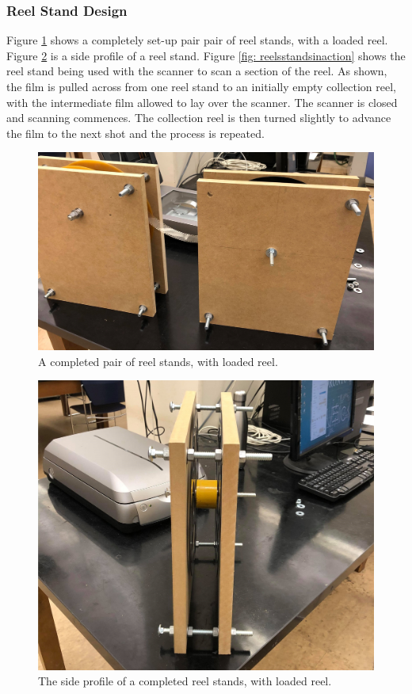 \documentclass[12pt]{article} %
\begin{document}
\subsubsection{Reel Stand Design}
Figure \ref{fig: full setup} shows a completely set-up pair pair of reel stands, with a loaded reel. Figure \ref{fig: side profile} is a side profile of a reel stand. Figure \ref{fig: reelsstandsinaction} shows the reel stand being used with the scanner to scan a section of the reel. As shown, the film is pulled across from one reel stand to an initially empty collection reel, with the intermediate film allowed to lay over the scanner. The scanner is closed and scanning commences. The collection reel is then turned slightly to advance the film to the next shot and the process is repeated.
\begin{figure}[htb]
    \centering
    \includegraphics[width=0.7\linewidth]{Images/Reel stand images/setupreelstands.jpg}
    \caption{A completed pair of reel stands, with loaded reel.}
    \label{fig: full setup}
\end{figure}
\begin{figure}[htb]
    \centering
    \includegraphics[width=0.7\linewidth]{Images/Reel stand images/reelstanddone.jpg}
    \caption{The side profile of a completed reel stands, with loaded reel.}
    \label{fig: side profile}
\end{figure}
\end{document}
